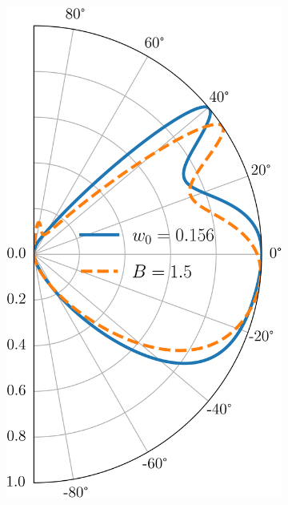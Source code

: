 \begin{figure}[H]
\begin{subfigure}[b]{0.3\linewidth}
            \includegraphics[width=\linewidth]{fig/pseudo B field/Ef0.0832 U0.285 B1.5 w0.156.png}
            \caption{}
            \label{fig:pseudo2}
        \end{subfigure}


\end{figure}
